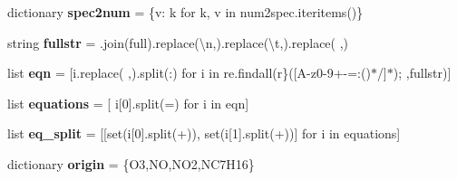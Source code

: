 \begin{DoxyCompactItemize}
\item 
\mbox{\label{namespaceMCM__getdata_a6f2d64def39b1298b7027f184a89799a}} 
dictionary {\bfseries spec2num} = \{v\+: k for k, v in num2spec.\+iteritems()\}
\item 
\mbox{\label{namespaceMCM__getdata_ae744e84ed43132fcea6cff97fb4c7f09}} 
string {\bfseries fullstr} = \textquotesingle{}\textquotesingle{}.join(full).replace(\textquotesingle{}\textbackslash{}n\textquotesingle{},\textquotesingle{}\textquotesingle{}).replace(\textquotesingle{}\textbackslash{}t\textquotesingle{},\textquotesingle{}\textquotesingle{}).replace(\textquotesingle{} \textquotesingle{},\textquotesingle{}\textquotesingle{})
\item 
\mbox{\label{namespaceMCM__getdata_aef48e03bafede08ea1c54b0a25c99ec2}} 
list {\bfseries eqn} = \mbox{[}i.\+replace(\textquotesingle{} \textquotesingle{},\textquotesingle{}\textquotesingle{}).split(\textquotesingle{}\+:\textquotesingle{}) for i in re.\+findall(r\textquotesingle{}\}(\mbox{[}A-\/z0-\/9+-\/=\+:()$\ast$/\mbox{]}$\ast$);\textquotesingle{} ,fullstr)\mbox{]}
\item 
\mbox{\label{namespaceMCM__getdata_ac6ca830b18e945e77d06d54b97ce29c0}} 
list {\bfseries equations} = \mbox{[} i\mbox{[}0\mbox{]}.split(\textquotesingle{}=\textquotesingle{}) for i in eqn\mbox{]}
\item 
\mbox{\label{namespaceMCM__getdata_ace6971f53b0e35f59d396ed1e1687e31}} 
list {\bfseries eq\+\_\+split} = \mbox{[}\mbox{[}set(i\mbox{[}0\mbox{]}.split(\textquotesingle{}+\textquotesingle{})), set(i\mbox{[}1\mbox{]}.split(\textquotesingle{}+\textquotesingle{}))\mbox{]} for i in equations\mbox{]}
\item 
\mbox{\label{namespaceMCM__getdata_a23a2b80b410ba3411a998006eda0ffa4}} 
dictionary {\bfseries origin} = \{\textquotesingle{}O3\textquotesingle{},\textquotesingle{}NO\textquotesingle{},\textquotesingle{}N\+O2\textquotesingle{},\textquotesingle{}N\+C7\+H16\textquotesingle{}\}
\item 
\mbox{\label{namespaceMCM__getdata_a5c8c593e0cf8e01a50ffe726c45b2660}} 

\end{DoxyCompactItemize}
